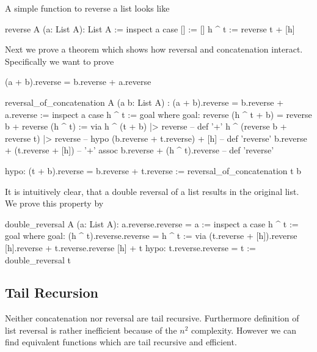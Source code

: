 A simple function to reverse a list looks like

\begin{alba}
  reverse A (a: List A): List A :=
    inspect a case
      [] :=
        []
      h ^ t :=
        reverse t + [h]
\end{alba}


Next we prove a theorem which shows how reversal and concatenation
interact. Specifically we want to prove
\begin{alba}
  (a + b).reverse = b.reverse + a.reverse
\end{alba}

\begin{alba}
  reversal_of_concatenation
    A
    (a b: List A)
    : (a + b).reverse = b.reverse + a.reverse :=
      inspect a case
        h ^ t :=
          goal where
             goal: reverse (h ^ t + b) = reverse b + reverse (h ^ t) :=
               via
                 h ^ (t + b) |> reverse                     -- def '+'
                 h ^ (reverse b + reverse t) |> reverse     -- hypo
                 (b.reverse + t.reverse) + [h]              -- def 'reverse'
                 b.reverse + (t.reverse + [h])              -- '+' assoc
                 b.reverse + (h ^ t).reverse                -- def 'reverse'

             hypo: (t + b).reverse = b.reverse + t.reverse :=
               reversal_of_concatenation t b
\end{alba}


It is intuitively clear, that a double reversal of a list results in the
original list. We prove this property by
%
\begin{alba}
  double_reversal A (a: List A): a.reverse.reverse = a :=
    inspect a case
      h ^ t :=
        goal where
          goal: (h ^ t).reverse.reverse = h ^ t :=
            via
              (t.reverse + [h]).reverse
              [h].reverse + t.reverse.reverse
              [h] + t
          hypo: t.reverse.reverse = t :=
            double_reversal t
\end{alba}



\subsection{Tail Recursion}

Neither concatenation nor reversal are tail recursive. Furthermore definition
of list reversal is rather inefficient because of the $n^2$
complexity. However we can find equivalent functions which are tail recursive
and efficient.

